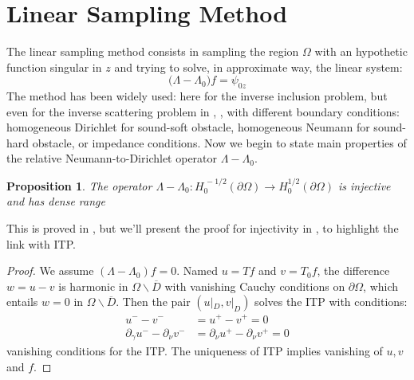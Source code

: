 \documentclass[10pt, a4paper, twoside, openright]{book}
\theoremstyle{definition}
\theoremstyle{plain}
\theoremstyle{plain}
\theoremstyle{plain}
\newtheorem{proposition}[subsection]{Proposition}
\theoremstyle{plain}
\theoremstyle{plain}
\theoremstyle{plain}
\theoremstyle{plain}
\theoremstyle{plain}
\begin{document}
\section{Linear Sampling Method}
 The linear sampling method consists in sampling the region $\Omega$ with an hypothetic function singular in $z$ and trying to solve, in approximate way, the linear system:
 \begin{equation}
  \bigl(\Lambda - \Lambda_0\bigr)f=\psi_{0z}
 \end{equation}
 The method has been widely used: here for the inverse inclusion problem, but even for the inverse scattering problem in \cite{cakoni-colton-haddar:lsm}, \cite{colton-haddar-piana:lsm}, with different boundary conditions: homogeneous Dirichlet for sound-soft obstacle, homogeneous Neumann for sound-hard obstacle, or impedance conditions.
 Now we begin to state main properties of the relative Neumann-to-Dirichlet operator $\Lambda - \Lambda_0$.
 \begin{proposition}
  The operator $\Lambda - \Lambda_0:H_0^{\,-1/2}(\partial \Omega)\to H_0^{1/2}(\partial \Omega)$ is injective and has dense range
 \end{proposition}
 This is proved in \cite{kirsch:book}, but we'll present the proof for injectivity in \cite{somersalo:preprint}, to highlight the link with ITP.
 \begin{proof}
 We assume $(\Lambda - \Lambda_0)f = 0$. Named $u=Tf$ and $v=T_0f$, the difference $w=u-v$ is harmonic in $\Omega\backslash\overline{D}$ with vanishing Cauchy conditions on $\partial \Omega$, which entails $w=0$ in $\Omega\backslash\overline{D}$. Then the pair $(u|_D,v|_D)$ solves the ITP with conditions:
 \begin{align}
  u^--v^- &=u^+ - v^+ = 0 \\
  \partial_\gamma u^- - \partial_\nu v^- &= \partial_\nu u^+ - \partial_\nu v^+ = 0 
 \end{align}
 vanishing conditions for the ITP. The uniqueness of ITP implies vanishing of $u,v$ and $f$. 
 \end{proof}
\end{document}
